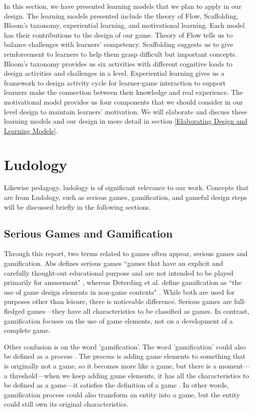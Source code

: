 \documentclass[12pt, a4paper]{report}
\begin{document}
In this section, we have presented learning models that we plan to apply in our design. The learning models presented include the theory of Flow, Scaffolding, Bloom's taxonomy, experiential learning, and motivational learning. Each model has their contributions to the design of our game. Theory of Flow tells us to balance challenges with learners' competency. Scaffolding suggests us to give reinforcement to learners to help them grasp difficult but important concepts. Bloom's taxonomy provides us six activities with different cognitive loads to design activities and challenges in a level. Experiential learning gives us a framework to design activity cycle for learner-game interaction to support learners make the connection between their knowledge and real experience. The motivational model provides us four components that we should consider in our level design to maintain learners' motivation. We will elaborate and discuss these learning models and our design in more detail in section \ref{Elaborating Design and Learning Models}. 

\section{Ludology}
Likewise pedagogy, ludology is of significant relevance to our work. Concepts that are from Ludology, such as serious games, gamification, and gameful design steps \cite{deterding2015lens} will be discussed briefly in the following sections.   

\subsection{Serious Games and Gamification}
Through this report, two terms related to games often appear, serious games and gamification. Abs defines serious games ``games that have an explicit and carefully thought-out educational purpose and are not intended to be played primarily for amusement" \cite{abt1987serious}, whereas Deterding et al. define gamification as ``the use of game design elements in non-game contexts" \cite{deterding2011game}. While both are used for purposes other than leisure, there is noticeable difference. Serious games are full-fledged games---they have all characteristics to be classified as games. In contrast, gamification focuses on the use of game elements, not on a development of a complete game. 

Other confusion is on the word 'gamification'. The word 'gamification' could also be defined as a process \cite{werbach2014re}. The process is adding game elements to something that is originally not a game, so it becomes more like a game, but there is a moment---a threshold---when we keep adding game elements, it has all the characteristics to be defined as a game---it satisfies the definition of a game \cite{yohannis2014defining}. In other words, gamification process could also transform an entity into a game, but the entity could still own its original characteristics. 
\end{document}
